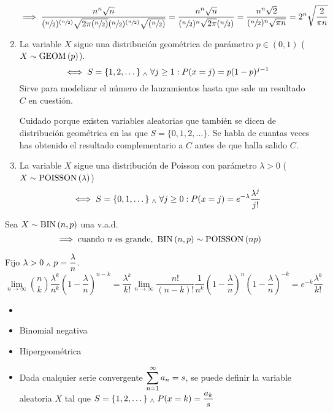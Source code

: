\begin{ejem}[Dados]
\begin{enumerate}
        \[\implies \frac{n^n\sqrt{n}}{(\sfrac{n}{2})^{(\sfrac{n}{2})}\sqrt{2\pi (\sfrac{n}{2})}(\sfrac{n}{2})^{(\sfrac{n}       {2})}\sqrt{(\sfrac{n}{2})}} = 
        \frac{n^n\sqrt{n}}
        {(\sfrac{n}{2})^{n}\sqrt{2\pi}(\sfrac{n}        {2})}=\frac{n^n\sqrt{2}}{(\sfrac{n}{2})^n\sqrt{\pi      n}}=2^n\sqrt{\frac{2}{\pi n}}\]
        \item La variable $X$ sigue una distribución geométrica de parámetro $p\in(0,1)$ ($X\sim\operatorname{GEOM}\left(p\right)$).
        \[\iff S=\{1, 2, \dots\} \; _{\wedge} \; \forall j \geq 1 : P(x=j)=p(1-p)^{j-1}\]
        Sirve para modelizar el número de lanzamientos hasta que sale un resultado $C$ en cuestión.
        \begin{obs}
            Cuidado porque existen variables aleatorias que también se dicen de distribución geométrica en las que $S=\{0, 1, 2, \dots\}$. Se habla de cuantas veces has obtenido el resultado complementario a $C$ antes de que halla salido $C$.
        \end{obs}
        \item La variable $X$ sigue una distribución de Poisson con parámetro $\lambda>0$ ($X\sim \operatorname{POISSON}\left(\lambda\right)$)
        \[\iff S=\{0, 1, \dots\} \; _{\wedge} \; \forall j \geq 0 : P(x=j)=e^{-\lambda}\frac{\lambda^j}{j!}\]
    \end{enumerate}
\end{ejem}

\begin{prop}
    Sea $X\sim \operatorname{BIN}\left(n, p\right)$ una v.a.d.
    \[\implies \text{cuando $n$ es grande, }\operatorname{BIN}\left(n, p\right)\sim\operatorname{POISSON}\left(np\right)\]
    \begin{dem}
        Fijo $\displaystyle\lambda>0 \; _{\wedge} \; p=\frac{\lambda}{n}$.
        \[\lim_{n\rightarrow\infty} \binom{n}{k}\frac{\lambda^k}{n^k}\left(1-\frac{\lambda}{n}\right)^{n-k}=\frac{\lambda^k}{k!}\lim_{n\rightarrow\infty} \frac{n!}{(n-k)!}\frac{1}{n^k}\left(1-\frac{\lambda}{n}\right)^n\left(1-\frac{\lambda}{n}\right)^{-k}=e^{-k}\frac{\lambda^k}{k!}\]
        
    \end{dem}
\end{prop}

\begin{ejem}
    \begin{itemize}
        \item[] 
        \item Binomial negativa
        \item Hipergeométrica
        \item Dada cualquier serie convergente $\displaystyle \sum_{n=1}^\infty a_n = s$, se puede definir la variable aleatoria $X$ tal que $\displaystyle S=\{1, 2, \dots\} \; _{\wedge} \; P(x=k)=\frac{a_k}{s}$
    \end{itemize}
\end{ejem}

